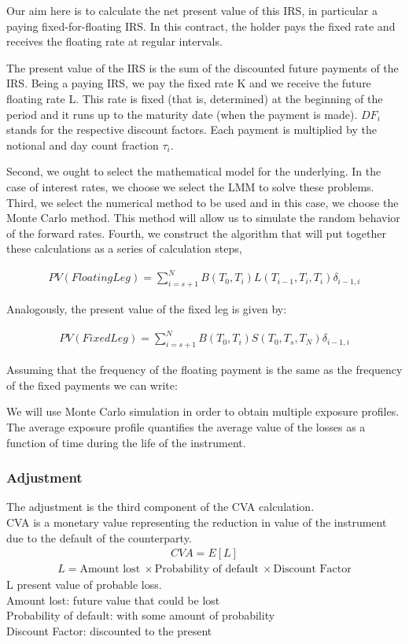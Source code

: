 \documentclass[11pt]{article}
\numberwithin{equation}{subsection}
\begin{document}
Our aim here is to calculate the net present value of this IRS, in particular a paying
fixed-for-floating IRS. In this contract, the holder pays the fixed rate and receives the
floating rate at regular intervals.

The present value of the IRS is the sum of the discounted future payments of the IRS.
Being a paying IRS, we pay the fixed rate K and we receive the future floating rate L.
This rate is fixed (that is, determined) at the beginning of the period and it runs up to
the maturity date (when the payment is made). \(DF_{i}\) stands for the respective discount
factors. Each payment is multiplied by the notional and day count fraction \(\tau_{i}\).

Second, we ought to select the mathematical model for the underlying. In the case
of interest rates, we choose we select the LMM to solve these problems. 
Third, we select the numerical method to be used and in this case, we choose the Monte Carlo method. This method will allow
us to simulate the random behavior of the forward rates. Fourth, we construct the
algorithm that will put together these calculations as a series of calculation steps,


\begin{eqnarray*}
	PV(Floating Leg) = \sum_{i=s+1}^{N} B(T_0, T_{i}) L(T_{i-1}, T_{i}, T_{i}) \delta_{i−1,i} 
\end{eqnarray*}

Analogously, the present value of the fixed leg is given by:

\begin{eqnarray*}
	PV(Fixed Leg) = \sum_{i=s+1}^{N} B(T_0, T_{i}) S(T_{0}, T_{s}, T_{N}) \delta_{i−1,i} 
\end{eqnarray*}

Assuming that the frequency of the floating payment is the same as the frequency of the
fixed payments we can write:


We will use Monte Carlo simulation in order to obtain multiple exposure profiles. The average exposure profile quantifies the average value of the losses as a function of time during the life of the instrument.

\subsubsection{Adjustment}
The adjustment is the third component of the CVA calculation. \\
\noindent CVA is a monetary value representing the reduction in value of the instrument due to the default of the counterparty.
\begin{eqnarray*}
CVA = E[L]
\end{eqnarray*}
\begin{eqnarray*}
L = \text{Amount lost} \ \times \text{Probability of default} \ \times \text{Discount Factor}
\end{eqnarray*}
L present value of probable loss. \\
Amount lost: future value that could be lost\\
Probability of default:  with some amount of probability\\
Discount Factor: discounted to the present
\end{document}

